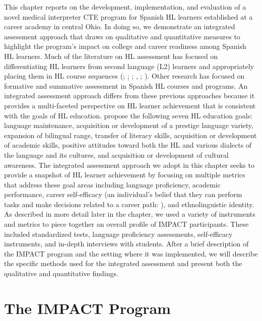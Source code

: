 \documentclass[output=paper]{langscibook}
\begin{document}
This chapter reports on the development, implementation, and evaluation of a novel medical interpreter CTE program for Spanish HL learners established at a career academy in central Ohio. In doing so, we demonstrate an integrated assessment approach that draws on qualitative and quantitative measures to highlight the program’s impact on college and career readiness among Spanish HL learners. Much of the literature on HL assessment has focused on differentiating HL learners from second language (L2) learners and appropriately placing them in HL course sequences (\citealt{Thompson2015}; \citealt{PotowskiMorgan-Short2012}; \citealt{VergaraWilson2012}; \citealt{Fairclough2006}, \citealt{Fairclough2012a}; \citealt{Beaudrie2012}). Other research has focused on formative \citep{Carreira2012} and summative assessment \citep{ParraPolinsky2018} in Spanish HL courses and programs. An integrated assessment approach differs from these previous approaches because it provides a multi-faceted perspective on HL learner achievement that is consistent with the goals of HL education. \citet{BeaudriePotowski2014} propose the following seven HL education goals: language maintenance, acquisition or development of a prestige language variety, expansion of bilingual range, transfer of literacy skills, acquisition or development of academic skills, positive attitudes toward both the HL and various dialects of the language and its cultures, and acquisition or development of cultural awareness. The integrated assessment approach we adopt in this chapter seeks to provide a snapshot of HL learner achievement by focusing on multiple metrics that address these goal areas including language proficiency, academic performance, career self-efficacy (an individual’s belief that they can perform tasks and make decisions related to a career path: \citealt{TaylorBetz1983}), and ethnolinguistic identity. As described in more detail later in the chapter, we used a variety of instruments and metrics to piece together an overall profile of IMPACT participants. These included standardized tests, language proficiency assessments, self-efficacy instruments, and in-depth interviews with students. After a brief description of the IMPACT program and the setting where it was implemented, we will describe the specific methods used for the integrated assessment and present both the qualitative and quantitative findings.

\section{The IMPACT Program}
\end{document}
